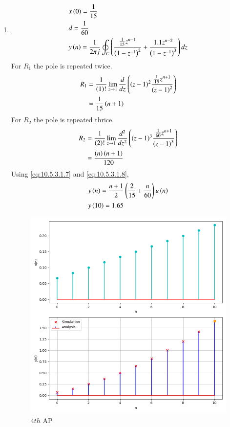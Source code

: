 \documentclass[journal,12pt,twocolumn]{IEEEtran}
\theoremstyle{remark}
\begin{document}
\begin{enumerate}[label=(\alph*)]
\item \begin{align}
        &x\left(0\right)=\frac{1}{15} \\
        &d=\frac{1}{60} \\
        &y\left(n\right)=\frac{1}{2\pi j}\oint_{C}\left(\dfrac{\frac{1}{15}z^{n-1}}{\left(1-z^{-1}\right)^2} + \dfrac{1.1z^{n-2}}{\left(1-z^{-1}\right)^{3}}\right)dz
    \end{align}
    For $R_1$ the pole is repeated twice.
\begin{align}
    R_1&=\frac{1}{\left(1\right)!}\lim\limits_{z\to 1}\frac{d}{dz}\left({\left(z-1\right)}^{2}\frac{\frac{1}{15}z^{n+1}}{{\left(z-1\right)}^2}\right)\\
    &=\frac{1}{15}\left(n+1\right)\label{eq:10.5.3.1.7}
\end{align}
    For $R_2$ the pole is repeated thrice.
\begin{align}
    R_2&=\frac{1}{\left(2\right)!}\lim\limits_{z\to 1}\frac{d^{2}}{dz^{2}}\left({\left(z-1\right)}^{3}\frac{\frac{1}{60}z^{n+1}}{{\left(z-1\right)}^3}\right)\\
    &=\frac{\left(n\right)\left(n+1\right)}{120}\label{eq:10.5.3.1.8}
\end{align}
Using \eqref{eq:10.5.3.1.7} and \eqref{eq:10.5.3.1.8},
\begin{align}
    &y\left(n\right)=\dfrac{n+1}{2}\left(\frac{2}{15}+\frac{n}{60}\right)u\left(n\right)\\
    &y\left(10\right)=1.65
\end{align}
\begin{figure}[h!]
        \centering
        \includegraphics[width=\columnwidth]{figs/plt4.png}
        \caption{$4th$ AP}
    \end{figure}
\end{enumerate}
\end{document}
